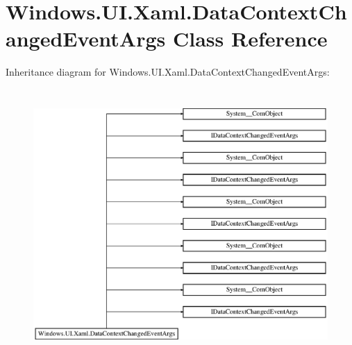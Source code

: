 \hypertarget{class_windows_1_1_u_i_1_1_xaml_1_1_data_context_changed_event_args}{}\section{Windows.\+U\+I.\+Xaml.\+Data\+Context\+Changed\+Event\+Args Class Reference}
\label{class_windows_1_1_u_i_1_1_xaml_1_1_data_context_changed_event_args}
Inheritance diagram for Windows.\+U\+I.\+Xaml.\+Data\+Context\+Changed\+Event\+Args\+:\begin{figure}[H]
\begin{center}
\leavevmode
\includegraphics[height=10.301003cm]{class_windows_1_1_u_i_1_1_xaml_1_1_data_context_changed_event_args}
\end{center}
\end{figure}
